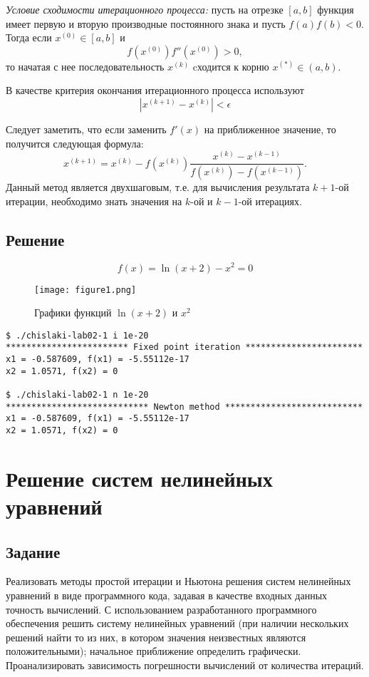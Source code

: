 \documentclass[a4paper,12pt]{article}
\begin{document}
\textit{Условие сходимости итерационного процесса:} пусть на отрезке
$[a, b]$ функция имеет первую и вторую производные постоянного знака и
пусть $f(a) f(b) < 0$. Тогда если $x^{(0)} \in [a, b]$ и
$$
f(x^{(0)}) f''(x^{(0)}) > 0,
$$
то начатая с нее последовательность $x^{(k)}$ cходится к корню
$x^{(*)} \in (a, b)$.

В качестве критерия окончания итерационного процесса используют
$$
|x^{(k + 1)} - x^{(k)}| < \epsilon
$$

Следует заметить, что если заменить $f'(x)$ на приближенное значение, то
получится следующая формула:
$$
x^{(k + 1)} = x^{(k)} - f(x^{(k)}) \frac{x^{(k)} - x^{(k - 1)}}{f(x^{(k)}) - f(x^{(k - 1)})}.
$$
Данный метод является двухшаговым, т.е. для вычисления результата $k + 1$-ой итерации,
необходимо знать значения на $k$-ой и $k - 1$-ой итерациях.

\subsection{Решение}
$$
f(x) = \ln{(x + 2)} - x^2 = 0
$$

\begin{figure}[htbp]
  \centering
  \texttt{[image: figure1.png]}
  \caption{Графики функций $\ln{(x + 2)}$ и $x^2$}
\end{figure}

\begin{verbatim}
$ ./chislaki-lab02-1 i 1e-20
************************ Fixed point iteration ***********************
x1 = -0.587609, f(x1) = -5.55112e-17
x2 = 1.0571, f(x2) = 0

$ ./chislaki-lab02-1 n 1e-20
**************************** Newton method ***************************
x1 = -0.587609, f(x1) = -5.55112e-17
x2 = 1.0571, f(x2) = 0
\end{verbatim}

\newpage

\section{Решение систем нелинейных уравнений}
\subsection{Задание}
Реализовать методы простой итерации и Ньютона решения систем нелинейных
уравнений в виде программного кода, задавая в качестве входных данных точность
вычислений. С использованием разработанного программного обеспечения решить
систему нелинейных уравнений (при наличии нескольких решений найти то из них, в
котором значения неизвестных являются положительными); начальное приближение
определить графически. Проанализировать зависимость погрешности вычислений от
количества итераций.
\end{document}
